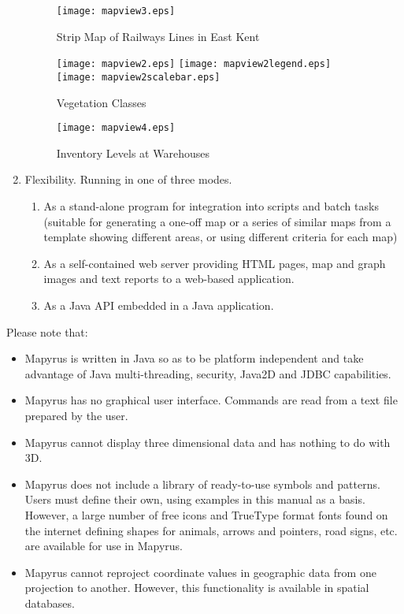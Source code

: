 \begin{enumerate}
\begin{figure}
\texttt{[image: mapview3.eps]}
\caption{Strip Map of Railways Lines in East Kent}
\label{mapview3}
\end{figure}

\begin{figure}
\texttt{[image: mapview2.eps]}
\texttt{[image: mapview2legend.eps]}
\vspace{1pt}
\texttt{[image: mapview2scalebar.eps]}
\caption{Vegetation Classes}
\label{mapview2}
\end{figure}

\begin{figure}
\texttt{[image: mapview4.eps]}
\caption{Inventory Levels at Warehouses}
\label{mapview4}
\end{figure}

\item
Flexibility.  Running in one of three modes.

\begin{enumerate}
\item
As a stand-alone program for integration into
scripts and batch tasks  (suitable for generating a one-off
map or a series of similar maps from a template
showing different areas, or using different criteria for each map)

\item
As a self-contained web server providing HTML pages, map and
graph images and text reports to a web-based application.

\item
As a Java API embedded in a Java application.
\end{enumerate}


\end{enumerate}

Please note that:

\begin{itemize}
\item
Mapyrus is written in Java so as to be platform independent
and take advantage of Java multi-threading, security,
Java2D and JDBC capabilities.

\item
Mapyrus has no graphical user interface.
Commands are read from a text file prepared by the user.

\item
Mapyrus cannot display three dimensional data and has nothing to do
with 3D.

\item
Mapyrus does not include a library of ready-to-use symbols and patterns.
Users must define their own, using examples in this manual as a basis.
However, a large number of free icons
and TrueType format fonts found on the internet
defining shapes for animals, arrows and pointers, road signs, etc. are
available for use in Mapyrus.

\item
Mapyrus cannot reproject coordinate values in geographic data from
one projection to another.  However, this functionality
is available in spatial databases.
\end{itemize}

